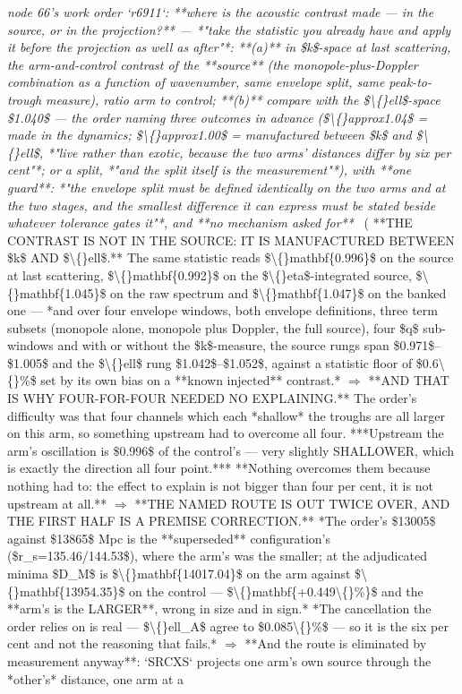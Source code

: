 \begin{description}
\textit{node 66's work order `r6911`: **where is the acoustic contrast made --- in the source, or in the projection?** --- *"take the statistic you already have and apply it before the projection as well as after"*: **(a)** in \$k\$-space at last scattering, the arm-and-control contrast of the **source** (the monopole-plus-Doppler combination as a function of wavenumber, same envelope split, same peak-to-trough measure), ratio arm to control; **(b)** compare with the \$\textbackslash\{\}ell\$-space \$1.040\$ --- the order naming three outcomes in advance (\$\textbackslash\{\}approx1.04\$ = made in the dynamics; \$\textbackslash\{\}approx1.00\$ = manufactured between \$k\$ and \$\textbackslash\{\}ell\$, *"live rather than exotic, because the two arms' distances differ by six per cent"*; or a split, *"and the split itself is the measurement"*), with **one guard**: *"the envelope split must be defined identically on the two arms and at the two stages, and the smallest difference it can express must be stated beside whatever tolerance gates it"*, and **no mechanism asked for**} \ ( **THE CONTRAST IS NOT IN THE SOURCE: IT IS MANUFACTURED BETWEEN \$k\$ AND \$\textbackslash\{\}ell\$.** The same statistic reads \$\textbackslash\{\}mathbf\{0.996\}\$ on the source at last scattering, \$\textbackslash\{\}mathbf\{0.992\}\$ on the \$\textbackslash\{\}eta\$-integrated source, \$\textbackslash\{\}mathbf\{1.045\}\$ on the raw spectrum and \$\textbackslash\{\}mathbf\{1.047\}\$ on the banked one --- *and over four envelope windows, both envelope definitions, three term subsets (monopole alone, monopole plus Doppler, the full source), four \$q\$ sub-windows and with or without the \$k\$-measure, the source rungs span \$0.971\$--\$1.005\$ and the \$\textbackslash\{\}ell\$ rung \$1.042\$--\$1.052\$, against a statistic floor of \$0.6\textbackslash\{\}\%\$ set by its own bias on a **known injected** contrast.* \ensuremath{\Rightarrow}  **AND THAT IS WHY FOUR-FOR-FOUR NEEDED NO EXPLAINING.** The order's difficulty was that four channels which each *shallow* the troughs are all larger on this arm, so something upstream had to overcome all four. ***Upstream the arm's oscillation is \$0.996\$ of the control's --- very slightly SHALLOWER, which is exactly the direction all four point.*** **Nothing overcomes them because nothing had to: the effect to explain is not bigger than four per cent, it is not upstream at all.** \ensuremath{\Rightarrow}  **THE NAMED ROUTE IS OUT TWICE OVER, AND THE FIRST HALF IS A PREMISE CORRECTION.** *The order's \$13005\$ against \$13865\$ Mpc is the **superseded** configuration's (\$r\_s=135.46/144.53\$), where the arm's was the smaller; at the adjudicated minima \$D\_M\$ is \$\textbackslash\{\}mathbf\{14017.04\}\$ on the arm against \$\textbackslash\{\}mathbf\{13954.35\}\$ on the control --- \$\textbackslash\{\}mathbf\{+0.449\textbackslash\{\}\%\}\$ and the **arm's is the LARGER**, wrong in size and in sign.*  *The cancellation the order relies on is real --- \$\textbackslash\{\}ell\_A\$ agree to \$0.085\textbackslash\{\}\%\$ --- so it is the six per cent and not the reasoning that fails.* \ensuremath{\Rightarrow} **And the route is eliminated by measurement anyway**: `SRCXS` projects one arm's own source through the *other's* distance, one arm at a 
\end{description}

